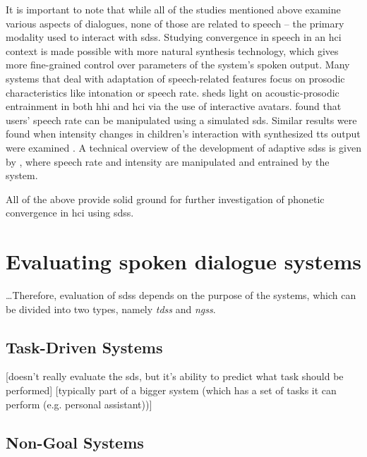 It is important to note that while all of the studies mentioned above examine various aspects of dialogues, none of those are related to speech -- the primary modality used to interact with \acp{sds}.
Studying convergence in speech in an \ac{hci} context is made possible with more natural synthesis technology, which gives more fine-grained control over parameters of the system's spoken output.
Many systems that deal with adaptation of speech-related features focus on prosodic characteristics like intonation or speech rate.
\citet{Levitan2014acoustic} sheds light on acoustic-prosodic entrainment in both \ac{hhi} and \ac{hci} via the use of interactive avatars.
\citet{Bell2003prosodic} found that users' speech rate can be manipulated using a simulated \ac{sds}.
Similar results were found when intensity changes in children's interaction with synthesized \ac{tts} output were examined \citep{Coulston2002amplitude}.
A technical overview of the development of adaptive \acp{sds} is given by \citet{Levitan2016implementing}, where speech rate and intensity are manipulated and entrained by the system.

All of the above provide solid ground for further investigation of phonetic convergence in \ac{hci} using \acp{sds}.

\section{Evaluating spoken dialogue systems}
\label{sec:evaluation_of_sdss}

\ldots Therefore, evaluation of \acp{sds} depends on the purpose of the systems, which can be divided into two types, namely \textit{\aclp{tds}} and \textit{\aclp{ngs}}.

\subsection{Task-Driven Systems}
\label{subsec:taskdrivensystems}
[doesn't really evaluate the \ac{sds}, but it's ability to predict what task should be performed]
[typically part of a bigger system (which has a set of tasks it can perform (e.g. personal assistant))]

\subsection{Non-Goal Systems}
\label{nongoalsystems}

